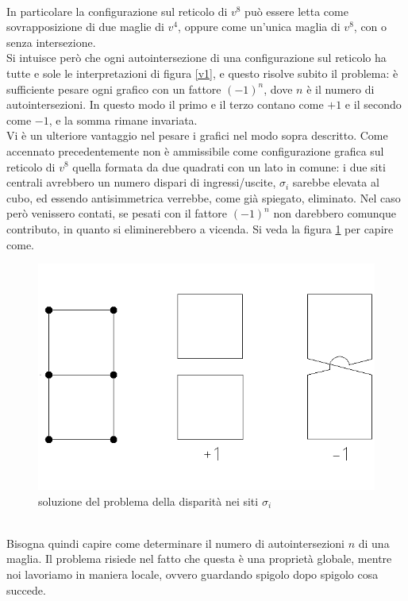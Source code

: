 \documentclass[11pt]{article}
\begin{document}
\\
In particolare la configurazione sul reticolo di $v^8$ può essere letta come sovrapposizione di due maglie di $v^4$, oppure come un'unica maglia di $v^8$, con o senza intersezione.\\
Si intuisce però che ogni autointersezione di una configurazione sul reticolo ha tutte e sole le interpretazioni di figura \ref{v1}, e questo risolve subito il problema: è sufficiente pesare ogni grafico con un fattore $(-1)^n$, dove $n$ è il numero di autointersezioni. In questo modo il primo e il terzo contano come $+1$ e il secondo come $-1$, e la somma rimane invariata.\\
Vi è un ulteriore vantaggio nel pesare i grafici nel modo sopra descritto. Come accennato precedentemente non è ammissibile come configurazione grafica sul reticolo di $v^8$ quella formata da due quadrati con un lato in comune: i due siti centrali avrebbero un numero dispari di ingressi/uscite, $\sigma_i$ sarebbe elevata al cubo, ed essendo antisimmetrica verrebbe, come già spiegato, eliminato. Nel caso però venissero contati, se pesati con il fattore $(-1)^n$ non darebbero comunque contributo, in quanto si eliminerebbero a vicenda. Si veda la figura \ref{v2} per capire come.
\begin{figure}[h]
\centering
\includegraphics[width=0.45\columnwidth]{v2}
\caption{soluzione del problema della disparità nei siti $\sigma_i$}
\label{v2}
\end{figure}
\\
Bisogna quindi capire come determinare il numero di autointersezioni $n$ di una maglia. Il problema risiede nel fatto che questa è una proprietà globale, mentre noi lavoriamo in maniera locale, ovvero guardando spigolo dopo spigolo cosa succede. 
\end{document}
